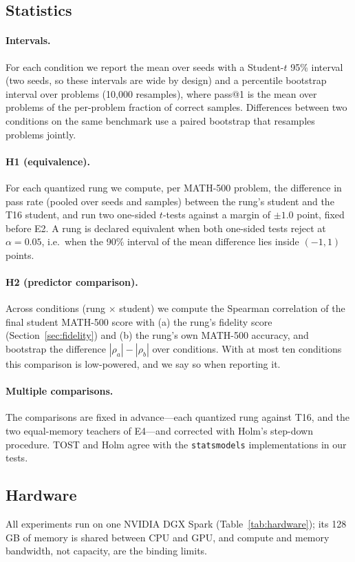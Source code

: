 \subsection{Statistics}\label{sec:stats}
\paragraph{Intervals.} For each condition we report the mean over seeds with a Student-$t$ 95\%
interval (two seeds, so these intervals are wide by design) and a percentile bootstrap interval
over problems (10{,}000 resamples), where pass@1 is the mean over problems of the per-problem
fraction of correct samples. Differences between two conditions on the same benchmark use a
paired bootstrap that resamples problems jointly.

\paragraph{H1 (equivalence).} For each quantized rung we compute, per MATH-500 problem, the
difference in pass rate (pooled over seeds and samples) between the rung's student and the
T16 student, and run two one-sided $t$-tests against a margin of $\pm1.0$ point, fixed before
E2. A rung is declared equivalent when both one-sided tests reject at $\alpha=0.05$, i.e.\ when
the 90\% interval of the mean difference lies inside $(-1, 1)$ points.

\paragraph{H2 (predictor comparison).} Across conditions (rung $\times$ student) we compute the
Spearman correlation of the final student MATH-500 score with (a) the rung's fidelity score
(Section~\ref{sec:fidelity}) and (b) the rung's own MATH-500 accuracy, and bootstrap the
difference $|\rho_a|-|\rho_b|$ over conditions. With at most ten conditions this comparison is
low-powered, and we say so when reporting it.

\paragraph{Multiple comparisons.} The comparisons are fixed in advance---each quantized rung
against T16, and the two equal-memory teachers of E4---and corrected with Holm's step-down
procedure. TOST and Holm agree with the \texttt{statsmodels} implementations in our tests.

\subsection{Hardware}
All experiments run on one NVIDIA DGX Spark (Table~\ref{tab:hardware}); its 128\,GB of memory is
shared between CPU and GPU, and compute and memory bandwidth, not capacity, are the binding
limits.


